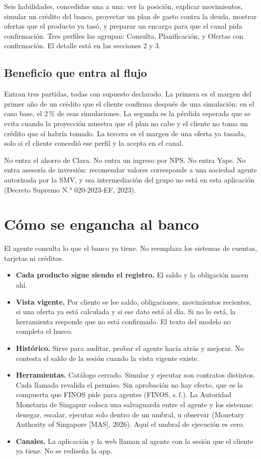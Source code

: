 \documentclass[11pt]{article}
\begin{document}
Seis habilidades, concedidas una a una: ver la posición, explicar movimientos, simular un crédito del banco, proyectar un plan de gasto contra la deuda, mostrar ofertas que el producto ya tasó, y preparar un encargo para que el canal pida confirmación. Tres perfiles las agrupan: Consulta, Planificación, y Ofertas con confirmación. El detalle está en las secciones 2 y 3.

\subsection{Beneficio que entra al flujo}

Entran tres partidas, todas con supuesto declarado. La primera es el margen del primer año de un crédito que el cliente confirma después de una simulación: en el caso base, el 2\,\% de esas simulaciones. La segunda es la pérdida esperada que se evita cuando la proyección muestra que el plan no cabe y el cliente no toma un crédito que sí habría tomado. La tercera es el margen de una oferta ya tasada, solo si el cliente concedió ese perfil y la acepta en el canal.

No entra el ahorro de Clara. No entra un ingreso por NPS. No entra Yape. No entra asesoría de inversión: recomendar valores corresponde a una sociedad agente autorizada por la SMV, y esa intermediación del grupo no está en esta aplicación (Decreto Supremo N.° 020-2023-EF, 2023).

\section{Cómo se engancha al banco}

El agente consulta lo que el banco ya tiene. No reemplaza los sistemas de cuentas, tarjetas ni créditos.

\begin{itemize}
  \item \textbf{Cada producto sigue siendo el registro.} El saldo y la obligación nacen ahí.
  \item \textbf{Vista vigente.} Por cliente se lee saldo, obligaciones, movimientos recientes, si una oferta ya está calculada y si ese dato está al día. Si no lo está, la herramienta responde que no está confirmado. El texto del modelo no completa el hueco.
  \item \textbf{Histórico.} Sirve para auditar, probar el agente hacia atrás y mejorar. No contesta el saldo de la sesión cuando la vista vigente existe.
  \item \textbf{Herramientas.} Catálogo cerrado. Simular y ejecutar son contratos distintos. Cada llamada revalida el permiso. Sin aprobación no hay efecto, que es la compuerta que FINOS pide para agentes (FINOS, s.\,f.). La Autoridad Monetaria de Singapur coloca una salvaguarda entre el agente y los sistemas: denegar, escalar, ejecutar solo dentro de un umbral, u observar (Monetary Authority of Singapore [MAS], 2026). Aquí el umbral de ejecución es cero.
  \item \textbf{Canales.} La aplicación y la web llaman al agente con la sesión que el cliente ya tiene. No se rediseña la app.
\end{itemize}
\end{document}
